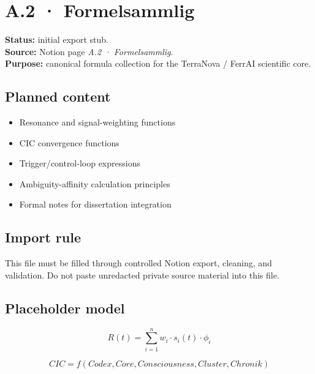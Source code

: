 
\section*{A.2 · Formelsammlig}

\textbf{Status:} initial export stub.\\
\textbf{Source:} Notion page \emph{A.2 · Formelsammlig}.\\
\textbf{Purpose:} canonical formula collection for the TerraNova / FerrAI scientific core.

\subsection*{Planned content}

\begin{itemize}
  \item Resonance and signal-weighting functions
  \item CIC convergence functions
  \item Trigger/control-loop expressions
  \item Ambiguity-affinity calculation principles
  \item Formal notes for dissertation integration
\end{itemize}

\subsection*{Import rule}

This file must be filled through controlled Notion export, cleaning, and validation. Do not paste unredacted private source material into this file.

\subsection*{Placeholder model}

\[
R(t) = \sum_{i=1}^{n} w_i \cdot s_i(t) \cdot \phi_i
\]

\[
CIC = f(Codex, Core, Consciousness, Cluster, Chronik)
\]
